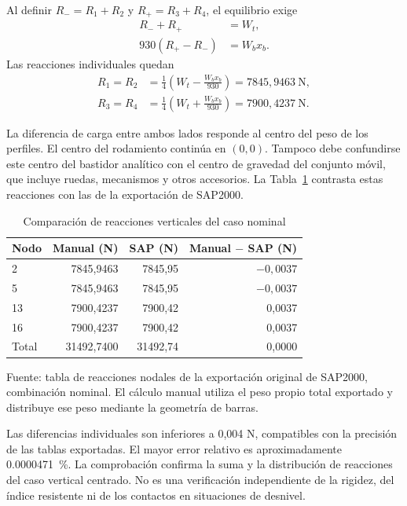 Al definir $R_-=R_1+R_2$ y $R_+=R_3+R_4$, el equilibrio exige
\begin{align}
R_-+R_+&=W_t,\\
930(R_+-R_-)&=W_bx_b.
\end{align}
Las reacciones individuales quedan
\begin{align}
R_1=R_2&=\frac{1}{4}\left(W_t-\frac{W_bx_b}{930}\right)
 =7845{,}9463\ \mathrm{N},\\
R_3=R_4&=\frac{1}{4}\left(W_t+\frac{W_bx_b}{930}\right)
 =7900{,}4237\ \mathrm{N}.
\label{eq:manual_ruedas}
\end{align}

La diferencia de carga entre ambos lados responde al centro del peso de los perfiles. El centro del rodamiento continúa en $(0,0)$. Tampoco debe confundirse este centro del bastidor analítico con el centro de gravedad del conjunto móvil, que incluye ruedas, mecanismos y otros accesorios. La Tabla~\ref{tab:manual_sap_revision} contrasta estas reacciones con las de la exportación de SAP2000.

\begin{table}[htbp]
\centering\small\singlespacing
\caption{Comparación de reacciones verticales del caso nominal}
\label{tab:manual_sap_revision}
\begin{tabular}{lrrr}
\toprule
\textbf{Nodo} & \textbf{Manual (N)} & \textbf{SAP (N)} & \textbf{Manual $-$ SAP (N)}\\
\midrule
2 & 7845,9463 & 7845,95 & $-0,0037$\\
5 & 7845,9463 & 7845,95 & $-0,0037$\\
13 & 7900,4237 & 7900,42 & 0,0037\\
16 & 7900,4237 & 7900,42 & 0,0037\\
\midrule
Total & 31492,7400 & 31492,74 & 0,0000\\
\bottomrule
\end{tabular}
\par\smallskip\footnotesize
Fuente: tabla de reacciones nodales de la exportación original de SAP2000, combinación nominal. El cálculo manual utiliza el peso propio total exportado y distribuye ese peso mediante la geometría de barras.
\end{table}

Las diferencias individuales son inferiores a 0,004 N, compatibles con la precisión de las tablas exportadas. El mayor error relativo es aproximadamente \SI{0.0000471}{\percent}. La comprobación confirma la suma y la distribución de reacciones del caso vertical centrado. No es una verificación independiente de la rigidez, del índice resistente ni de los contactos en situaciones de desnivel.

